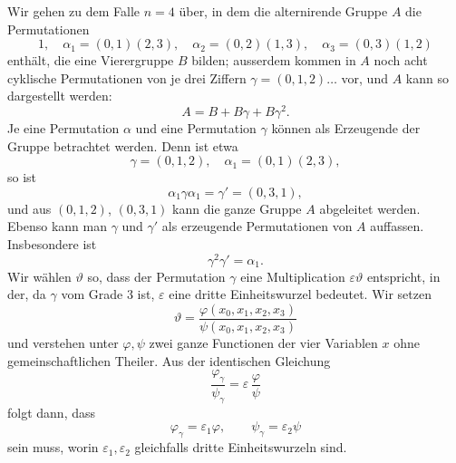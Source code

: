 \documentclass[11pt]{article}
\begin{document}
Wir gehen zu dem Falle \(n=4\) über, in dem die alternirende Gruppe \(A\) die Permutationen
\[
1,\quad
\alpha_1=(0,1)(2,3),\quad
\alpha_2=(0,2)(1,3),\quad
\alpha_3=(0,3)(1,2)
\]
enthält, die eine Vierergruppe \(B\) bilden; ausserdem kommen in \(A\) noch acht cyklische Permutationen von je drei Ziffern \(\gamma=(0,1,2)\ldots\) vor, und \(A\) kann so dargestellt werden:
\[
A=B+B\gamma+B\gamma^2.
\]
Je eine Permutation \(\alpha\) und eine Permutation \(\gamma\) können als Erzeugende der Gruppe betrachtet werden. Denn ist etwa
\[
\gamma=(0,1,2),\quad \alpha_1=(0,1)(2,3),
\]
so ist
\begin{equation}
\alpha_1\gamma\alpha_1=\gamma'=(0,3,1),
\tag{1}
\end{equation}
und aus \((0,1,2)\), \((0,3,1)\) kann die ganze Gruppe \(A\) abgeleitet werden. Ebenso kann man \(\gamma\) und \(\gamma'\) als erzeugende Permutationen von \(A\) auffassen. Insbesondere ist
\begin{equation}
\gamma^2\gamma'=\alpha_1.
\tag{2}
\end{equation}
Wir wählen \(\vartheta\) so, dass der Permutation \(\gamma\) eine Multiplication \(\varepsilon\vartheta\) entspricht, in der, da \(\gamma\) vom Grade \(3\) ist, \(\varepsilon\) eine dritte Einheitswurzel bedeutet. Wir setzen
\begin{equation}
\vartheta=
\frac{\varphi(x_0,x_1,x_2,x_3)}
{\psi(x_0,x_1,x_2,x_3)}
\tag{3}
\end{equation}
und verstehen unter \(\varphi,\psi\) zwei ganze Functionen der vier Variablen \(x\) ohne gemeinschaftlichen Theiler. Aus der identischen Gleichung
\[
\frac{\varphi_\gamma}{\psi_\gamma}
=\varepsilon\,\frac{\varphi}{\psi}
\]
folgt dann, dass
\begin{equation}
\varphi_\gamma=\varepsilon_1\varphi,\qquad
\psi_\gamma=\varepsilon_2\psi
\tag{4}
\end{equation}
sein muss, worin \(\varepsilon_1,\varepsilon_2\) gleichfalls dritte Einheitswurzeln sind.
\end{document}
